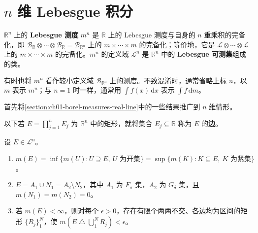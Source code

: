 \documentclass[../../main.tex]{subfiles}%
\begin{document}
\section{\texorpdfstring{$n$}{n} 维 Lebesgue 积分}\label{section:ch02-n-dimensional-lebesgue-integral}
\begin{definition}[$n$ 维 Lebesgue 测度]\label{definition:ch02-nd-lebesgue-measure}
$\mathbb{R}^n$ 上的 \textbf{Lebesgue 测度} $m^n$ 是 $\mathbb{R}$ 上的 Lebesgue 测度与自身的 $n$ 重乘积的完备化，即 $\mathscr{B}_{\mathbb{R}}\otimes\cdots\otimes\mathscr{B}_{\mathbb{R}}=\mathscr{B}_{\mathbb{R}^n}$ 上的 $m\times\cdots\times m$ 的完备化；等价地，它是 $\mathscr{L}\otimes\cdots\otimes\mathscr{L}$ 上的 $m\times\cdots\times m$ 的完备化。$m^n$ 的定义域 $\mathscr{L}^n$ 是 $\mathbb{R}^n$ 中的 \textbf{Lebesgue 可测集}组成的类。
\end{definition}
\begin{remark}
有时也将 $m^n$ 看作较小定义域 $\mathscr{B}_{\mathbb{R}^n}$ 上的测度。不致混淆时，通常省略上标 $n$，以 $m$ 表示 $m^n$；与 $n=1$ 时一样，通常用 $\int f(x)\,\mathrm{d}x$ 表示 $\int f\,\mathrm{d}m$。
\end{remark}
首先将\cref{section:ch01-borel-measures-real-line}中的一些结果推广到 $n$ 维情形。
\begin{definition}[矩形的边]\label{definition:ch02-rectangle-sides}
以下若 $E=\prod_{j=1}^n E_j$ 为 $\mathbb{R}^n$ 中的矩形，就将集合 $E_j\subseteq\mathbb{R}$ 称为 $E$ 的\textbf{边}。
\end{definition}
\begin{theorem}\label{theorem:ch02-nd-regularity}
设 $E\in\mathscr{L}^n$。
\begin{enumerate}
\item\label{item:ch02-nd-regularity-open-compact} $m(E)=\inf\{m(U):U\supseteq E,\ U\text{ 为开集}\}=\sup\{m(K):K\subseteq E,\ K\text{ 为紧集}\}$。
\item\label{item:ch02-nd-regularity-borel-null} $E=A_1\cup N_1=A_2\setminus N_2$，其中 $A_1$ 为 $F_\sigma$ 集，$A_2$ 为 $G_\delta$ 集，且 $m(N_1)=m(N_2)=0$。
\item\label{item:ch02-nd-regularity-rectangles} 若 $m(E)<\infty$，则对每个 $\epsilon>0$，存在有限个两两不交、各边均为区间的矩形 $\{R_j\}_1^N$，使 $m(E\mathbin{\triangle}\bigcup_1^N R_j)<\epsilon$。
\end{enumerate}
\end{theorem}
\end{document}
